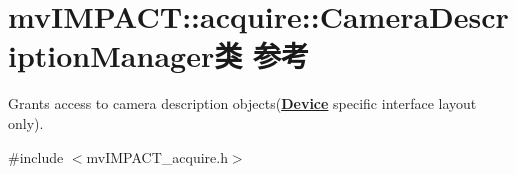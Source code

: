 \hypertarget{classmv_i_m_p_a_c_t_1_1acquire_1_1_camera_description_manager}{\section{mv\+I\+M\+P\+A\+C\+T\+:\+:acquire\+:\+:Camera\+Description\+Manager类 参考}
\label{classmv_i_m_p_a_c_t_1_1acquire_1_1_camera_description_manager}
}


Grants access to camera description objects({\bfseries \hyperlink{classmv_i_m_p_a_c_t_1_1acquire_1_1_device}{Device}} specific interface layout only).  




{\ttfamily \#include $<$mv\+I\+M\+P\+A\+C\+T\+\_\+acquire.\+h$>$}


